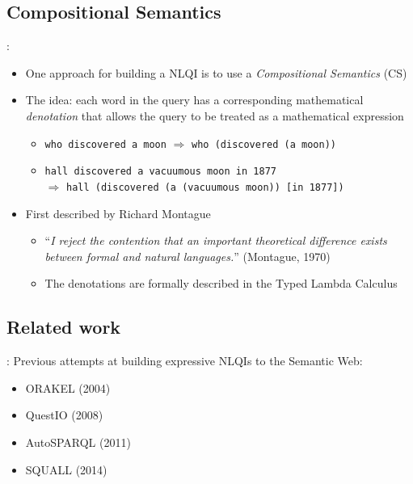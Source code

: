 \documentclass[logoontitle,tabu,supertabular,aspectratio=43]{preney-uwindsor-beamer}
\begin{document}
    \subsection{Compositional Semantics}
    \begin{frame}{\insertsection: \insertsubsection}
        \begin{itemize}
            \item One approach for building a NLQI is to use a {\em Compositional Semantics} (CS)
            \item The idea: each word in the query has a corresponding mathematical {\em denotation} that allows the query to be treated as a mathematical expression
            \begin{itemize}
                \item \texttt{who discovered a moon} $\Rightarrow$ \texttt{who (discovered (a moon))}
                \item \texttt{hall discovered a vacuumous moon in 1877} \\ $\Rightarrow$ \texttt{hall (discovered (a (vacuumous moon)) [in 1877])}
            \end{itemize}
            \item First described by Richard Montague \cite{Dowty:wall}
            \begin{itemize}
                \item ``\textit{I reject the contention that an important theoretical difference exists between formal and natural languages.}'' (Montague, 1970)
                \item The denotations are formally described in the Typed Lambda Calculus
            \end{itemize}
        \end{itemize}
    \end{frame}

    \subsection{Related work}
    \begin{frame}{\insertsection: \insertsubsection}
        Previous attempts at building expressive NLQIs to the Semantic Web:
        \begin{itemize}
            \item ORAKEL (2004) \cite{cimiano2007orakel}
            \item QuestIO (2008) \cite{tablan2008natural}
            \item AutoSPARQL (2011) \cite{lehmann2011autosparql}
            \item SQUALL (2014) \cite{ferre2014squall}
        \end{itemize}
    \end{frame}
\end{document}
